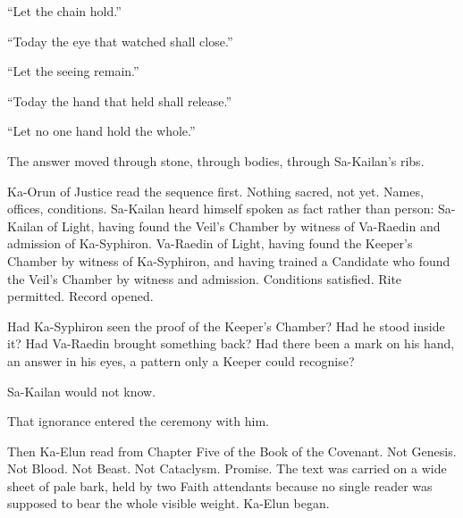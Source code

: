 “Let the chain hold.”\par

“Today the eye that watched shall close.”\par

“Let the seeing remain.”\par

“Today the hand that held shall release.”\par

“Let no one hand hold the whole.”\par

The answer moved through stone, through bodies, through Sa-Kailan’s ribs.\par

Ka-Orun of Justice read the sequence first. Nothing sacred, not yet. Names, offices, conditions. Sa-Kailan heard himself spoken as fact rather than person: Sa-Kailan of Light, having found the Veil’s Chamber by witness of Va-Raedin and admission of Ka-Syphiron. Va-Raedin of Light, having found the Keeper’s Chamber by witness of Ka-Syphiron, and having trained a Candidate who found the Veil’s Chamber by witness and admission. Conditions satisfied. Rite permitted. Record opened.\par

Had Ka-Syphiron seen the proof of the Keeper’s Chamber? Had he stood inside it? Had Va-Raedin brought something back? Had there been a mark on his hand, an answer in his eyes, a pattern only a Keeper could recognise?\par

Sa-Kailan would not know.\par

That ignorance entered the ceremony with him.\par

Then Ka-Elun read from Chapter Five of the Book of the Covenant. Not Genesis. Not Blood. Not Beast. Not Cataclysm. Promise. The text was carried on a wide sheet of pale bark, held by two Faith attendants because no single reader was supposed to bear the whole visible weight. Ka-Elun began.\par

